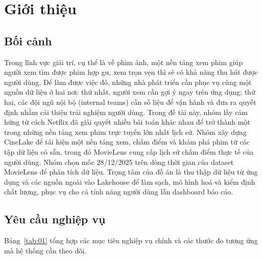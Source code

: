 \documentclass[a4paper,11pt]{article}
\begin{document}
\clearpage
\begingroup
  \small
  \tableofcontents
  \clearpage
  \listoffigures
  \clearpage
  \listoftables
\endgroup

\clearpage
{}

\section{Giới thiệu}\label{sec:1}

\subsection{Bối cảnh}\label{sec:1.1}

Trong lĩnh vực giải trí, cụ thể là về phim ảnh, một nền tảng xem phim giúp người xem tìm được phim hợp gu, xem trọn vẹn thì sẽ có khả năng thu hút được người dùng. Để làm được việc đó, những nhà phát triển cần phục vụ cùng một nguồn dữ liệu ở hai nơi: thứ nhất, người xem cần gợi ý ngay trên ứng dụng; thứ hai, các đội ngũ nội bộ (internal teams) cần số liệu để vận hành và đưa ra quyết định nhằm cải thiện trải nghiệm người dùng.
\newline
Trong đề tài này, nhóm lấy cảm hứng từ cách Netflix đã giải quyết nhiều bài toán khác nhau để trở thành một trong những nền tảng xem phim trực tuyến lớn nhất lịch sử. Nhóm xây dựng CineLake để tái hiện một nền tảng xem, chấm điểm và khám phá phim từ các tập dữ liệu có sẵn, trong đó MovieLens cung cấp lịch sử chấm điểm thực tế của người dùng. Nhóm chọn mốc 28/12/2025 trên dòng thời gian của dataset MovieLens để phân tích dữ liệu. Trọng tâm của đồ án là thu thập dữ liệu từ ứng dụng và các nguồn ngoài vào Lakehouse để làm sạch, mô hình hoá và kiểm định chất lượng, phục vụ cho cả tính năng người dùng lẫn dashboard báo cáo.

\subsection{Yêu cầu nghiệp vụ}\label{sec:1.2}

Bảng~\ref{tab:01} tổng hợp các mục tiêu nghiệp vụ chính và các thước đo tương ứng mà hệ thống cần theo dõi.
\end{document}
